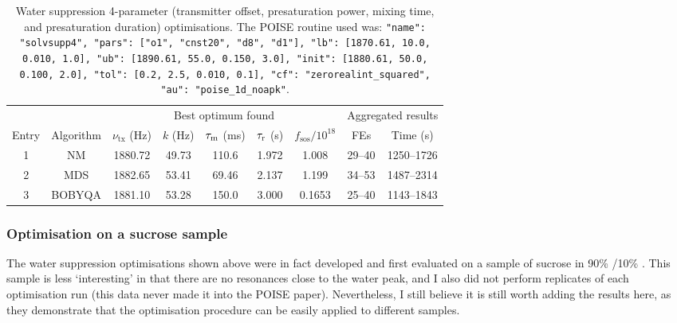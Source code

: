 \begin{table}
    \centering
    \begin{tabular}{ccccccccc}
        \toprule
              &           & \multicolumn{5}{c}{Best optimum found} & \multicolumn{2}{c}{Aggregated results} \\
                            \cmidrule(lr){3-7}                       \cmidrule(lr){8-9}
        Entry & Algorithm & $\nu_\text{tx}$ (\si{\Hz}) & $k$ (\si{\Hz}) & $\tau_\mathrm{m}$ (\si{\ms}) & $\tau_\mathrm{r}$ (\si{\s}) & $f_\text{sos} / 10^{18}$ & FEs    & Time (\si{\s}) \\
        \midrule
        1     & NM        & 1880.72                    & 49.73          & 110.6              & 1.972             & 1.008                    & 29--40 & 1250--1726     \\
        2     & MDS       & 1882.65                    & 53.41          & 69.46              & 2.137             & 1.199                    & 34--53 & 1487--2314     \\
        3     & BOBYQA    & 1881.10                    & 53.28          & 150.0              & 3.000             & 0.1653                   & 25--40 & 1143--1843     \\
        \bottomrule
    \end{tabular}
    \caption{
        Water suppression 4-parameter (transmitter offset, presaturation power, mixing time, and presaturation duration) optimisations.
        The POISE routine used was: \texttt{{"name": "solvsupp4", "pars": ["o1", "cnst20", "d8", "d1"], "lb": [1870.61, 10.0, 0.010, 1.0], "ub": [1890.61, 55.0, 0.150, 3.0], "init": [1880.61, 50.0, 0.100, 2.0], "tol": [0.2, 2.5, 0.010, 0.1], "cf": "zerorealint_squared", "au": "poise_1d_noapk"}}.
    }
    \label{tbl:poise_solvsupp4p}
\end{table}




\subsubsection{Optimisation on a sucrose sample}

The water suppression optimisations shown above were in fact developed and first evaluated on a sample of sucrose in 90\% /10\% .
This sample is less `interesting' in that there are no resonances close to the water peak, and I also did not perform replicates of each optimisation run (this data never made it into the POISE paper).
Nevertheless, I still believe it is still worth adding the results here, as they demonstrate that the optimisation procedure can be easily applied to different samples.


